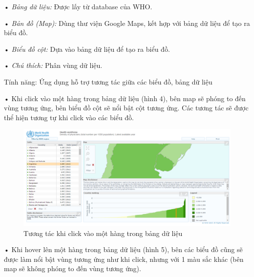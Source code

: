 \documentclass[12pt,a4paper]{article}
\begin{document}
\begin{list}{}{}
\item[•] \emph{Bảng dữ liệu:} Được lấy từ database của WHO.
\item[•] \emph{Bản đồ (Map):} Dùng thư viện Google Maps, kết hợp với bảng dữ liệu để tạo ra biểu đồ.
\item[•] \emph{Biểu đồ cột:} Dựa vào bảng dữ liệu để tạo ra biểu đồ.
\item[•] \emph{Chú thích:} Phân vùng dữ liệu.
\end{list}

Tính năng: Ứng dụng hỗ trợ tương tác giữa các biểu đồ, bảng dữ liệu

\begin{list}{}{}
\item[•] Khi click vào một hàng trong bảng dữ liệu (hình 4), bên map sẽ phóng to đến vùng tương ứng, bên biểu đồ cột sẽ nổi bật cột tương ứng. Các tương tác sẽ được thể hiện tương tự khi click vào các biểu đồ.

\begin{figure}[htp]
    \begin{center}
    \includegraphics[scale=.4]{image/clickatlas}
    \caption{Tương tác khi click vào một hàng trong bảng dữ liệu}
    \label{fig:clickatlas}
    \end{center}
\end{figure}

\item[•] Khi hover lên một hàng trong bảng dữ liệu (hình 5), bên các biểu đồ cũng sẽ được làm nổi bật vùng tương ứng như khi click, nhưng với 1 màu sắc khác (bên map sẽ không phóng to đến vùng tương ứng).
\end{list}
\end{document}
